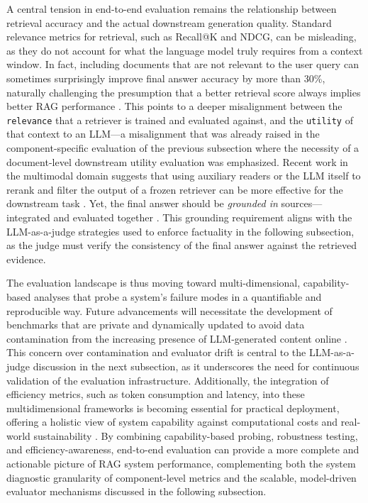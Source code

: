 \documentclass[11pt,a4paper]{article}
\begin{document}
A central tension in end-to-end evaluation remains the relationship between retrieval accuracy and the actual downstream generation quality. Standard relevance metrics for retrieval, such as Recall@K and NDCG, can be misleading, as they do not account for what the language model truly requires from a context window. In fact, including documents that are not relevant to the user query can sometimes surprisingly improve final answer accuracy by more than 30\%, naturally challenging the presumption that a better retrieval score always implies better RAG performance \cite{arxiv:2401.14887v3}. This points to a deeper misalignment between the \texttt{relevance} that a retriever is trained and evaluated against, and the \texttt{utility} of that context to an LLM---a misalignment that was already raised in the component-specific evaluation of the previous subsection where the necessity of a document-level downstream utility evaluation was emphasized. Recent work in the multimodal domain suggests that using auxiliary readers or the LLM itself to rerank and filter the output of a frozen retriever can be more effective for the downstream task \cite{arxiv:2312.10997v5,arxiv:2401.06954v2}. Yet, the final answer should be \emph{grounded in} sources---integrated and evaluated together \cite{arxiv:2312.10997v5}. This grounding requirement aligns with the LLM-as-a-judge strategies used to enforce factuality in the following subsection, as the judge must verify the consistency of the final answer against the retrieved evidence.

The evaluation landscape is thus moving toward multi-dimensional, capability-based analyses that probe a system's failure modes in a quantifiable and reproducible way. Future advancements will necessitate the development of benchmarks that are private and dynamically updated to avoid data contamination from the increasing presence of LLM-generated content online \cite{arxiv:2405.07437v2,arxiv:2305.17493v3}. This concern over contamination and evaluator drift is central to the LLM-as-a-judge discussion in the next subsection, as it underscores the need for continuous validation of the evaluation infrastructure. Additionally, the integration of efficiency metrics, such as token consumption and latency, into these multidimensional frameworks is becoming essential for practical deployment, offering a holistic view of system capability against computational costs and real-world sustainability \cite{arxiv:2407.16833v1}. By combining capability-based probing, robustness testing, and efficiency-awareness, end-to-end evaluation can provide a more complete and actionable picture of RAG system performance, complementing both the system diagnostic granularity of component-level metrics and the scalable, model-driven evaluator mechanisms discussed in the following subsection.
\end{document}
